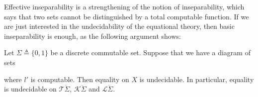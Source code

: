 \documentclass[a4paper,UKenglish,cleveref, autoref, thm-restate]{lipics-v2021}
\begin{document}
Effective inseparability is a strengthening of the notion of inseparability,
which says that two sets cannot be distinguished by a total computable
function.  If we are just interested in the undecidability of the equational
theory, then basic inseparability is enough, as the following argument shows:

\begin{theorem}[Undecidability]
  \label{thm:undecidability}
  Let $ \Sigma   \triangleq  \{0,1\}$ be a discrete commutable set.  Suppose that we have a
  diagram of sets
  \begin{center}
  \end{center}
  where $l'$ is computable.  Then equality on $X$ is undecidable.  In
  particular, equality is undecidable on $\mathcal{T}\ddot{ \Sigma }$,
  $\mathcal{K}\ddot{ \Sigma }$ and $\mathcal{L}\ddot{ \Sigma }$.
\end{theorem}
\end{document}
